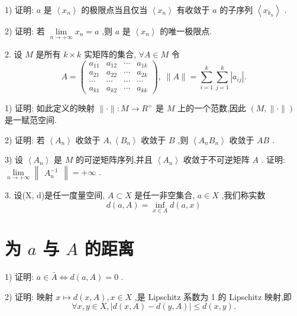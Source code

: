 1) 证明: $a$ 是 $\left\langle  {x}_{n}\right\rangle$ 的极限点当且仅当 $\left\langle  {x}_{n}\right\rangle$ 有收敛于 $a$ 的子序列 $\left\langle  {x}_{{k}_{n}}\right\rangle$ .

2) 证明: 若 $\mathop{\lim }\limits_{{n \rightarrow   + \infty }}{x}_{n} = a$ ,则 $a$ 是 $\left\langle  {x}_{n}\right\rangle$ 的唯一极限点.

2. 设 $M$ 是所有 $k \times  k$ 实矩阵的集合, $\forall A \in  M$ 令
$$A = \left( \begin{matrix} {a}_{11} & {a}_{12} & \cdots & {a}_{1k} \\  {a}_{21} & {a}_{22} & \cdots & {a}_{2k} \\  \cdots & \cdots & \cdots & \cdots \\  {a}_{k1} & {a}_{k2} & \cdots & {a}_{kk} \end{matrix}\right) ,\;\parallel A\parallel  = \mathop{\sum }\limits_{{i = 1}}^{k}\mathop{\sum }\limits_{{j = 1}}^{k}\left| {a}_{ij}\right| .$$

1) 证明: 如此定义的映射 $\parallel  \cdot  \parallel  : M \rightarrow  {R}^{ + }$ 是 $M$ 上的一个范数,因此 $\left( {M,\parallel  \cdot  \parallel }\right)$ 是一赋范空间.

2) 证明: 若 $\left\langle  {A}_{n}\right\rangle$ 收敛于 $A,\left\langle  {B}_{n}\right\rangle$ 收敛于 $B$ ,则 $\left\langle  {{A}_{n}{B}_{n}}\right\rangle$ 收敛于 ${AB}$ .

3) 设 $\left\langle  {A}_{n}\right\rangle$ 是 $M$ 的可逆矩阵序列,并且 $\left\langle  {A}_{n}\right\rangle$ 收敛于不可逆矩阵 $A$ . 证明: $\mathop{\lim }\limits_{{n \rightarrow   + \infty }}\begin{Vmatrix}{A}_{n}^{-1}\end{Vmatrix} =  + \infty$ .

3. 设(X, d)是任一度量空间, $A \subset  X$ 是任一非空集合, $a \in  X$ ,我们称实数
$$d\left( {a,A}\right)  = \mathop{\inf }\limits_{{x \in  A}}d\left( {a,x}\right)$$

\section*{为 $a$ 与 $A$ 的距离}

1) 证明: $a \in  \bar{A} \Leftrightarrow  d\left( {a,A}\right)  = 0$ .

2) 证明: 映射 $x \mapsto  d\left( {x,A}\right) ,x \in  X$ ,是 Lipschitz 系数为 1 的 Lipschitz 映射,即
$$\forall x,y \in  X,\left| {d\left( {x,A}\right)  - d\left( {y,A}\right) }\right|  \leq  d\left( {x,y}\right) .$$

